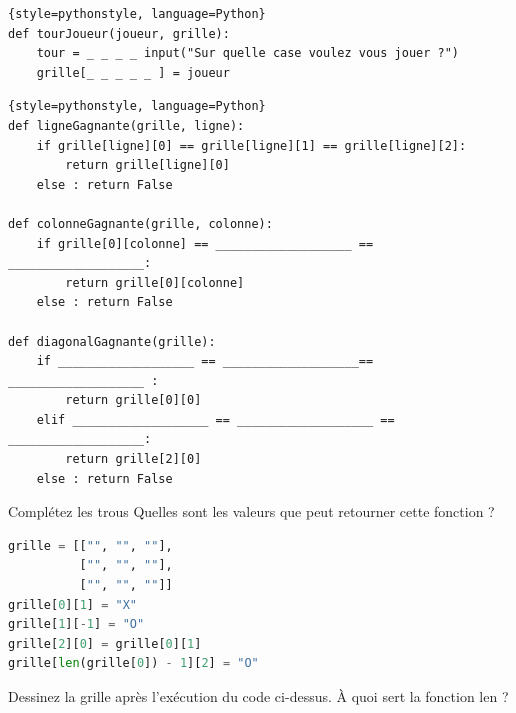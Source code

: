 \begin{lstlisting}{style=pythonstyle, language=Python}
def tourJoueur(joueur, grille):
    tour = _ _ _ _ input("Sur quelle case voulez vous jouer ?")
    grille[_ _ _ _ _ ] = joueur
\end{lstlisting}

\vfill



\begin{Exercise}[title={Rappels sur les listes}]
\begin{lstlisting}{style=pythonstyle, language=Python}
def ligneGagnante(grille, ligne):
    if grille[ligne][0] == grille[ligne][1] == grille[ligne][2]:
        return grille[ligne][0]
    else : return False
    
def colonneGagnante(grille, colonne):
    if grille[0][colonne] == ___________________ == ___________________:
        return grille[0][colonne]
    else : return False

def diagonalGagnante(grille):
    if ___________________ == ___________________== ___________________ :
        return grille[0][0]
    elif ___________________ == ___________________ == ___________________:
        return grille[2][0]
    else : return False

\end{lstlisting}
\Question Complétez les trous
\Question Quelles sont les valeurs que peut retourner cette fonction ?

\begin{lstlisting}[style=pythonstyle, language=Python]
grille = [["", "", ""],
          ["", "", ""],
          ["", "", ""]]
grille[0][1] = "X"
grille[1][-1] = "O"
grille[2][0] = grille[0][1]
grille[len(grille[0]) - 1][2] = "O"
\end{lstlisting}
\Question Dessinez la grille après l'exécution du code ci-dessus.
\Question À quoi sert la fonction len ?
\end{Exercise}

\vfill

